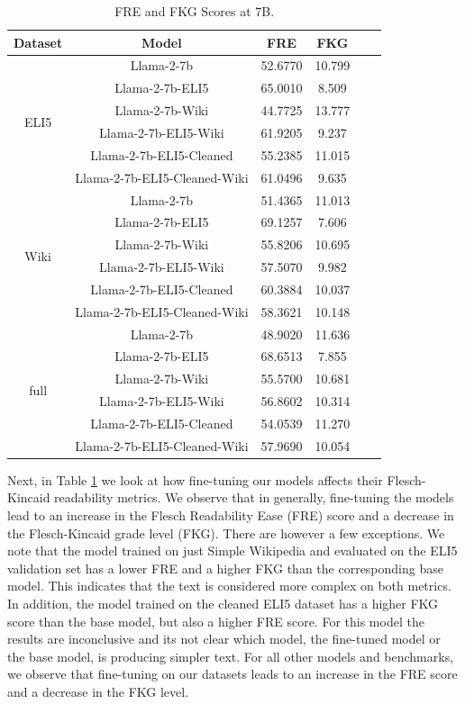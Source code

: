 \documentclass[11pt, oneside]{article}   	%
\begin{document}
\begin{table}[h]
\centering
\begin{tabular}{cccccc}
\hline
Dataset & Model & FRE & FKG \\
\hline
\multirow{6}{*}{ELI5} & Llama-2-7b & 52.6770 & 10.799 \\
 & Llama-2-7b-ELI5 & 65.0010 & 8.509 \\
 & Llama-2-7b-Wiki & 44.7725 & 13.777 \\
 & Llama-2-7b-ELI5-Wiki & 61.9205 & 9.237 \\
  & Llama-2-7b-ELI5-Cleaned & 55.2385 & 11.015 \\
 & Llama-2-7b-ELI5-Cleaned-Wiki & 61.0496 & 9.635 \\
\hline
\multirow{6}{*}{Wiki} & Llama-2-7b & 51.4365 & 11.013 \\
 & Llama-2-7b-ELI5 & 69.1257 & 7.606 \\
 & Llama-2-7b-Wiki & 55.8206 & 10.695 \\
 & Llama-2-7b-ELI5-Wiki & 57.5070 & 9.982 \\
  & Llama-2-7b-ELI5-Cleaned & 60.3884 & 10.037 \\
 & Llama-2-7b-ELI5-Cleaned-Wiki & 58.3621 & 10.148 \\
\hline
\multirow{6}{*}{full} & Llama-2-7b & 48.9020 & 11.636 \\
 & Llama-2-7b-ELI5 & 68.6513 & 7.855 \\
 & Llama-2-7b-Wiki & 55.5700 & 10.681 \\
 & Llama-2-7b-ELI5-Wiki & 56.8602 & 10.314 \\
  & Llama-2-7b-ELI5-Cleaned & 54.0539 & 11.270 \\
 & Llama-2-7b-ELI5-Cleaned-Wiki & 57.9690 & 10.054 \\
\hline
\end{tabular}
\caption{FRE and FKG Scores at 7B.}
\label{tab:flesch_scores_7B}
\end{table}
Next, in Table \ref{tab:flesch_scores_7B} we look at how fine-tuning our models affects their Flesch-Kincaid readability metrics.
We observe that in generally, fine-tuning the models lead to an increase in the Flesch Readability Ease (FRE) score and a decrease in the Flesch-Kincaid grade level (FKG). 
There are however a few exceptions.
We note that the model trained on just Simple Wikipedia and evaluated on the ELI5 validation set has a lower FRE and a higher FKG than the corresponding base model.
This indicates that the text is considered more complex on both metrics.
In addition, the model trained on the cleaned ELI5 dataset has a higher FKG score than the base model, but also a higher FRE score.
For this model the results are inconclusive and its not clear which model, the fine-tuned model or the base model, is producing simpler text.
For all other models and benchmarks, we observe that fine-tuning on our datasets leads to an increase in the FRE score and a decrease in the FKG level.
\end{document}
